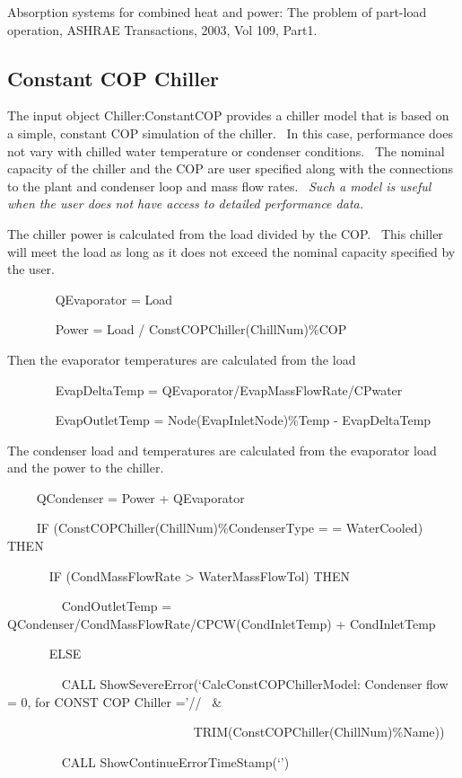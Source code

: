 Absorption systems for combined heat and power: The problem of part-load operation, ASHRAE Transactions, 2003, Vol 109, Part1.

\subsection{Constant COP Chiller}\label{constant-cop-chiller}

The input object Chiller:ConstantCOP provides a chiller model that is based on a simple, constant COP simulation of the chiller.~ In this case, performance does not vary with chilled water temperature or condenser conditions.~ The nominal capacity of the chiller and the COP are user specified along with the connections to the plant and condenser loop and mass flow rates.~ \emph{Such a model is useful when the user does not have access to detailed performance data.}

The chiller power is calculated from the load divided by the COP.~ This chiller will meet the load as long as it does not exceed the nominal capacity specified by the user.

~~~~~~~ QEvaporator = Load

~~~~~~~ Power = Load / ConstCOPChiller(ChillNum)\%COP

Then the evaporator temperatures are calculated from the load

~~~~~~~ EvapDeltaTemp = QEvaporator/EvapMassFlowRate/CPwater

~~~~~~~ EvapOutletTemp = Node(EvapInletNode)\%Temp - EvapDeltaTemp

The condenser load and temperatures are calculated from the evaporator load and the power to the chiller.

~~~~ QCondenser = Power + QEvaporator

~~~~ IF (ConstCOPChiller(ChillNum)\%CondenserType = = WaterCooled) THEN

~~~~~~ IF (CondMassFlowRate \textgreater{} WaterMassFlowTol) THEN

~~~~~~~~ CondOutletTemp = QCondenser/CondMassFlowRate/CPCW(CondInletTemp) + CondInletTemp

~~~~~~ ELSE

~~~~~~~~ CALL ShowSevereError(`CalcConstCOPChillerModel: Condenser flow = 0, for CONST COP Chiller ='//~ \&

~~~~~~ ~~~~~~~~~~~~~~~~~~~~~~~TRIM(ConstCOPChiller(ChillNum)\%Name))

~~~~~~~~ CALL ShowContinueErrorTimeStamp(`')

